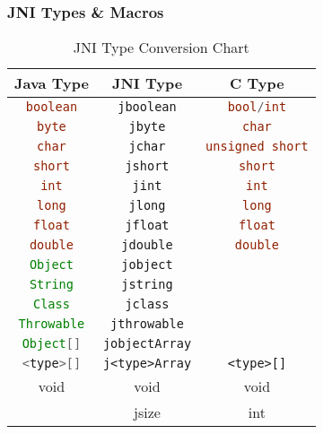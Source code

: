 \documentclass[10pt,mathserif]{beamer}
\begin{document}
	\begin{frame}
		\frametitle{JNI Types \& Macros}

		\begin{table}
			\begin{minipage}{\textwidth}
				\centering
				\begin{tabular}{|c|c|c|}
					\hline
					{\bfseries Java Type} & {\bfseries JNI Type} & {\bfseries C Type} \\ \hline
					\lstinline[language=java]{boolean} & \lstinline{jboolean} & \lstinline[language=c]{bool/int} \\
					\lstinline[language=java]{byte} & \lstinline{jbyte} & \lstinline[language=c]{char} \\
					\lstinline[language=java]{char} & \lstinline{jchar} & \lstinline[language=c]{unsigned short} \\
					\lstinline[language=java]{short} & \lstinline{jshort} & \lstinline[language=c]{short} \\
					\lstinline[language=java]{int} & \lstinline{jint} & \lstinline[language=c]{int} \\
					\lstinline[language=java]{long} & \lstinline{jlong} & \lstinline[language=c]{long} \\
					\lstinline[language=java]{float} & \lstinline{jfloat} & \lstinline[language=c]{float} \\
					\lstinline[language=java]{double} & \lstinline{jdouble} & \lstinline[language=c]{double} \\
					\lstinline[language=java]{Object} & \lstinline{jobject} & \\
					\lstinline[language=java]{String} & \lstinline{jstring} & \\
					\lstinline[language=java]{Class} & \lstinline{jclass} & \\
					\lstinline[language=java]{Throwable} & \lstinline{jthrowable} & \\
					\lstinline[language=java]{Object[]} & \lstinline{jobjectArray} & \\
					\lstinline[language=java]{<type>[]} & \lstinline{j<type>Array} & \lstinline{<type>[]} \\
					void & void & void \\
					 & jsize & int \\
					\hline
				\end{tabular}
				\caption{JNI Type Conversion Chart}
			\end{minipage}
		\end{table}
	\end{frame}
\end{document}
